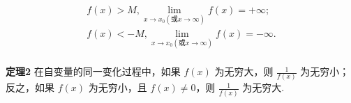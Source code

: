 \begin{gather}
f(x) > M, \lim_{x \to x_0 (\text{或}x \to \infty)} f(x) = + \infty; \\
f(x) < - M, \lim_{x \to x_0 (\text{或}x \to \infty)} f(x) = - \infty.
\end{gather}

\paragraph{}
\textbf{定理2} 在自变量的同一变化过程中，如果 $f(x)$ 为无穷大，则 $\frac{1}{f(x)}$ 为无穷小；反之，如果 $f(x)$ 为无穷小，且 $f(x) \neq 0$，则 $\frac{1}{f(x)}$ 为无穷大.
